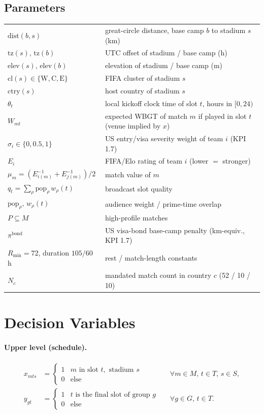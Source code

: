 \documentclass[12pt, letterpaper]{article}
\newcommand{\dist}{\mathrm{dist}}
\newcommand{\elev}{\mathrm{elev}}
\newcommand{\tzone}{\mathrm{tz}}
\newcommand{\cl}{\mathrm{cl}}
\newcommand{\ctry}{\mathrm{ctry}}
\begin{document}
\subsection*{Parameters}
\begin{tabular}{@{}lp{11.2cm}@{}}
\toprule
$\dist(b,s)$ & great-circle distance, base camp $b$ to stadium $s$ (km) \\
$\tzone(s),\,\tzone(b)$ & UTC offset of stadium / base camp (h) \\
$\elev(s),\,\elev(b)$ & elevation of stadium / base camp (m) \\
$\cl(s)\in\{\mathrm{W,C,E}\}$ & FIFA cluster of stadium $s$ \\
$\ctry(s)$ & host country of stadium $s$ \\
$\theta_t$ & local kickoff clock time of slot $t$, hours in $[0,24)$ \\
$W_{mt}$ & expected WBGT of match $m$ if played in slot $t$
           (venue implied by $x$) \\
$\sigma_i\in\{0,0.5,1\}$ & US entry/visa severity weight of team $i$
                           (KPI 1.7) \\
$E_i$ & FIFA/Elo rating of team $i$ (lower $=$ stronger) \\
$\mu_m=(E_{i(m)}^{-1}+E_{j(m)}^{-1})/2$ & match value of $m$ \\
$q_t=\sum_{\rho}\mathrm{pop}_\rho\,w_\rho(t)$ & broadcast slot quality \\
$\mathrm{pop}_\rho,\,w_\rho(t)$ & audience weight / prime-time overlap \\
$P\subseteq M$ & high-profile matches \\
$\pi^{\mathrm{bond}}$ & US visa-bond base-camp penalty (km-equiv., KPI 1.7) \\
$R_{\min}=72$, duration $105/60$ h & rest / match-length constants \\
$N_c$ & mandated match count in country $c$ (52 / 10 / 10) \\
\bottomrule
\end{tabular}

\section{Decision Variables}

\paragraph{Upper level (schedule).}
\begin{align}
x_{mts} &=
  \begin{cases} 1 & m \text{ in slot } t,\text{ stadium } s\\ 0 &
  \text{else}\end{cases}
  &&\forall m\in M,\,t\in T,\,s\in S,\\
y_{gt} &=
  \begin{cases} 1 & t \text{ is the final slot of group } g\\ 0 &
  \text{else}\end{cases}
  &&\forall g\in G,\,t\in T.
\end{align}
\end{document}
